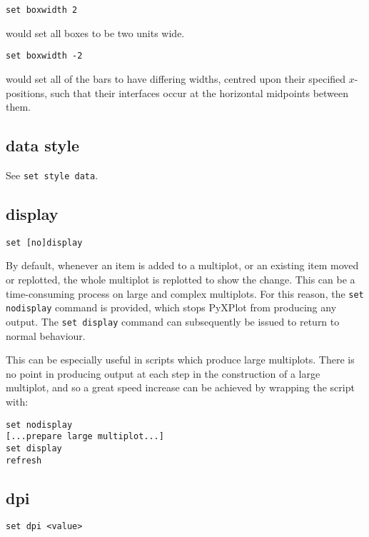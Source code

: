 \begin{verbatim}
set boxwidth 2
\end{verbatim}

\noindent would set all boxes to be two units wide.

\begin{verbatim}
set boxwidth -2
\end{verbatim}

\noindent would set all of the bars to have differing widths, centred upon their
specified $x$-positions, such that their interfaces occur at the horizontal
midpoints between them.


\subsection{data style}

See {\tt set style data}.

\subsection{display}

\begin{verbatim}
set [no]display
\end{verbatim}

By default, whenever an item is added to a multiplot, or an existing item moved
or replotted, the whole multiplot is replotted to show the change. This can be
a time-consuming process on large and complex multiplots. For this reason, the
{\tt set nodisplay} command is provided, which stops PyXPlot from producing any
output. The {\tt set display} command can subsequently be issued to return to
normal behaviour.

This can be especially useful in scripts which produce large multiplots. There
is no point in producing output at each step in the construction of a large
multiplot, and so a great speed increase can be achieved by wrapping the script
with:

\begin{verbatim}
set nodisplay 
[...prepare large multiplot...] 
set display 
refresh
\end{verbatim}


\subsection{dpi}

\begin{verbatim}
set dpi <value>
\end{verbatim}

